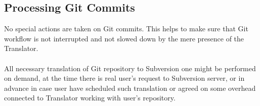 \subsection{Processing Git Commits}

No special actions are taken on Git commits. This helps to make sure that Git workflow is not interrupted and not slowed down by
the mere presence of the Translator.
\\\\
All necessary translation of Git repository to Subversion one might be performed on demand, at the time there is real user's request
to Subversion server, or in advance in case user have scheduled such translation or agreed on some overhead connected to Translator
working with user's repository.